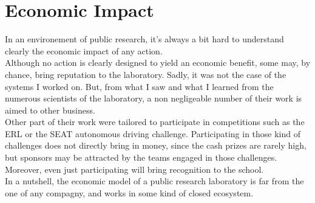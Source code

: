 \chapter{Economic Impact}

\label{economic}

In an environement of public research, it's always a bit hard to understand clearly the economic impact of any action.\\

Although no action is clearly designed to yield an economic benefit, some may, by chance, bring reputation to the laboratory.
Sadly, it was not the case of the systems I worked on.
But, from what I saw and what I learned from the numerous scientists of the laboratory, a non negligeable number of their work is aimed to other business.\\

Other part of their work were tailored to participate in competitions such as the ERL or the SEAT autonomous driving challenge.
Participating in those kind of challenges does not directly bring in money, since the cash prizes are rarely high, but sponsors may be attracted by the teams engaged in those challenges.
Moreover, even just participating will bring recognition to the school.\\

In a nutshell, the economic model of a public research laboratory is far from the one of any compagny, and works in some kind of closed ecosystem.
